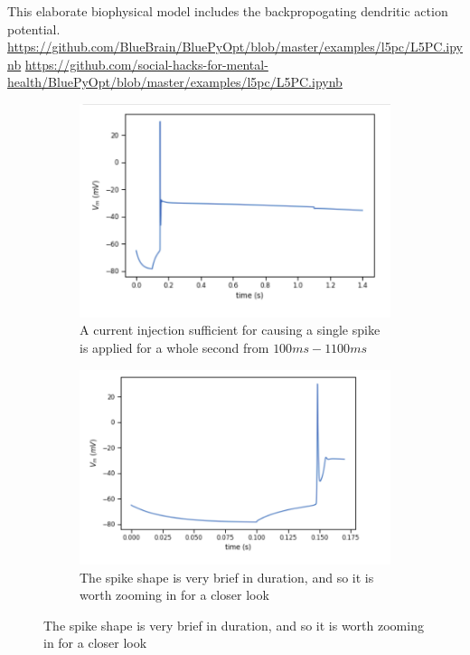 This elaborate biophysical model includes the backpropogating dendritic action potential.
\url{https://github.com/BlueBrain/BluePyOpt/blob/master/examples/l5pc/L5PC.ipynb}
\url{https://github.com/social-hacks-for-mental-health/BluePyOpt/blob/master/examples/l5pc/L5PC.ipynb}


\begin{figure}
\begin{center}


\centering
\begin{subfigure}{.2}
  \centering
    \includegraphics[scale=0.5]{figures/correct_active_l5pc.png}
    \caption{A current injection sufficient for causing a single spike is applied for a whole second from $100ms-1100ms$}
  \label{fig:sub1}
\end{subfigure}

\centering
\begin{subfigure}{.2}
  \centering
    \includegraphics[scale=0.5]{figures/spike_shape.png}
    \caption{The spike shape is very brief in duration, and so it is worth zooming in for a closer look}
  \label{fig:sub1}
\end{subfigure}



\end{center}
\end{figure}
